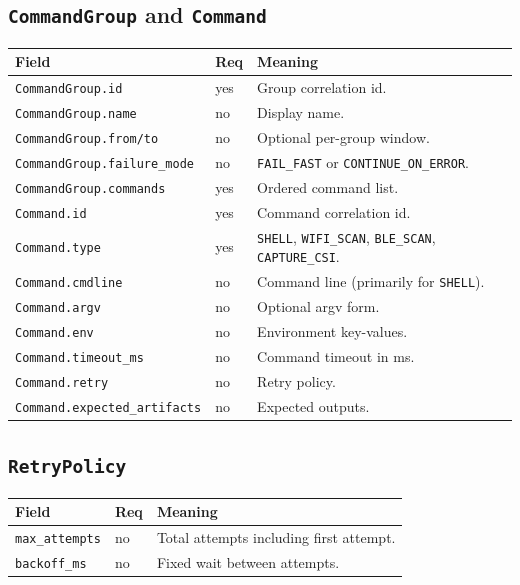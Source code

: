 \documentclass[11pt,a4paper]{article}
\begin{document}
\subsection{\texttt{CommandGroup} and \texttt{Command}}
\begin{longtable}{p{4.1cm}p{1.6cm}p{9.3cm}}
\textbf{Field} & \textbf{Req} & \textbf{Meaning} \\
\hline
\endhead
\texttt{CommandGroup.id} & yes & Group correlation id. \\
\texttt{CommandGroup.name} & no & Display name. \\
\texttt{CommandGroup.from/to} & no & Optional per-group window. \\
\texttt{CommandGroup.failure\_mode} & no & \texttt{FAIL\_FAST} or \texttt{CONTINUE\_ON\_ERROR}. \\
\texttt{CommandGroup.commands} & yes & Ordered command list. \\
\texttt{Command.id} & yes & Command correlation id. \\
\texttt{Command.type} & yes & \texttt{SHELL}, \texttt{WIFI\_SCAN}, \texttt{BLE\_SCAN}, \texttt{CAPTURE\_CSI}. \\
\texttt{Command.cmdline} & no & Command line (primarily for \texttt{SHELL}). \\
\texttt{Command.argv} & no & Optional argv form. \\
\texttt{Command.env} & no & Environment key-values. \\
\texttt{Command.timeout\_ms} & no & Command timeout in ms. \\
\texttt{Command.retry} & no & Retry policy. \\
\texttt{Command.expected\_artifacts} & no & Expected outputs. \\
\hline
\end{longtable}

\subsection{\texttt{RetryPolicy}}
\begin{longtable}{p{4.1cm}p{1.6cm}p{9.3cm}}
\textbf{Field} & \textbf{Req} & \textbf{Meaning} \\
\hline
\endhead
\texttt{max\_attempts} & no & Total attempts including first attempt. \\
\texttt{backoff\_ms} & no & Fixed wait between attempts. \\
\hline
\end{longtable}
\end{document}
